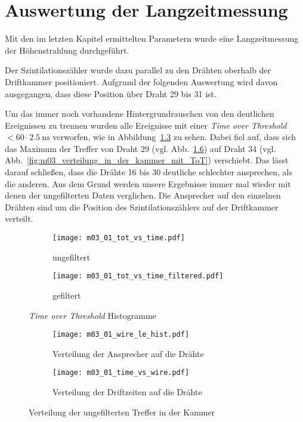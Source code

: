 \documentclass[11pt, ngerman, fleqn, DIV=15, headinclude, BCOR=2cm]{scrreprt}
\begin{document}

\clearpage


\chapter{Auswertung der Langzeitmessung}

Mit den im letzten Kapitel ermittelten Parametern wurde eine Langzeitmessung
der Höhenstrahlung durchgeführt.

Der Szintilationszähler wurde dazu parallel zu den Drähten oberhalb der
Driftkammer positioniert. Aufgrund der folgenden Auswertung wird davon
ausgegangen, dass diese Position über Draht 29 bis 31 ist.

Um das immer noch vorhandene Hintergrundrauschen von den deutlichen
Ereignissen zu trennen wurden alle Ereignisse mit einer \emph{Time over
Threshold} $ < 60 \cdot \SI{2.5}{\nano\second}$ verworfen, wie in 
Abbildung~\ref{fig:m03_tot_vs_time} zu sehen.
Dabei fiel auf, dass sich das Maximum der Treffer von Draht 29
(vgl. Abb.~\ref{fig:m03_verteilung_in_der_kammer}) auf Draht 34 (vgl.
Abb.~\ref{fig:m03_verteilung_in_der_kammer_mit_ToT}) verschiebt. Das lässt
darauf schließen, dass die Drähte 16 bis 30 deutliche schlechter ansprechen,
als die anderen. Aus dem Grund werden unsere Ergebnisse immer mal wieder mit
denen der ungefilterten Daten verglichen.
Die Ansprecher auf den einzelnen Drähten sind um die Position des
Szintilationszählers auf der Driftkammer verteilt.


\begin{figure}
	\centering
	\begin{subfigure}{0.49 \linewidth}
		\texttt{[image: m03\_01\_tot\_vs\_time.pdf]}
		\caption{%
			ungefiltert
		}
		\label{fig:m03_tot_vs_time_unfiltered}
	\end{subfigure}
	\begin{subfigure}{0.49 \linewidth}
		\texttt{[image: m03\_01\_tot\_vs\_time\_filtered.pdf]}
		\caption{%
			gefiltert
		}
		\label{fig:m03_tot_vs_time_filtered}
	\end{subfigure}
	\caption{%
		\emph{Time over Threshold} Histogramme
	}
	\label{fig:m03_tot_vs_time}
\end{figure}

\begin{figure}
	\centering
	\begin{subfigure}{0.49 \linewidth}
		\texttt{[image: m03\_01\_wire\_le\_hist.pdf]}
		\caption{%
			Verteilung der Ansprecher auf die Drähte
		}
		\label{fig:m03_wire_le_hist_filtered}
	\end{subfigure}
	\begin{subfigure}{0.49 \linewidth}
		\texttt{[image: m03\_01\_time\_vs\_wire.pdf]}
		\caption{%
			Verteilung der Driftzeiten auf die Drähte
		}
		\label{fig:m03_time_vs_wire_filtered}
	\end{subfigure}
	\caption{%
		Verteilung der ungefilterten Treffer in der Kammer
	}
	\label{fig:m03_verteilung_in_der_kammer}
\end{figure}
\end{document}

